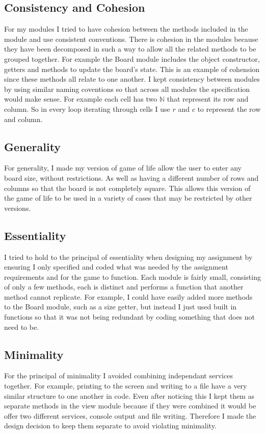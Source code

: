 \documentclass[12pt]{article}
\begin{document}
\subsection{Consistency and Cohesion}
For my modules I tried to have cohesion between the methods included in the module and use consistent conventions. There is cohesion in the modules because they have been decomposed in such a way to allow all the related methods to be grouped together. For example the Board module includes the object constructor, getters and methods to update the board's state. This is an example of cohension since these methods all relate to one another. I kept consistency between modules by using similar naming coventions so that across all modules the specification would make sense. For example each cell has two $\mathbb{N}$ that represent its row and column. So in every loop iterating through cells I use $r$ and $c$ to represent the row and column.

\subsection{Generality}
For generality, I made my version of game of life allow the user to enter any board size, without restrictions. As well as having a different number of rows and columns so that the board is not completely square. This allows this version of the game of life to be used in a variety of cases that may be restricted by other versions.

\subsection{Essentiality}
I tried to hold to the principal of essentiality when designing my assignment by ensuring I only specified and coded what was needed by the assignment requirements and for the game to function. Each module is fairly small, consisting of only a few methods, each is distinct and performs a function that another method cannot replicate. For example, I could have easily added more methods to the Board module, such as a size getter, but instead I just used built in functions so that it was not being redundant by coding something that does not need to be.

\subsection{Minimality}
For the principal of minimality I avoided combining independant services together. For example, printing to the screen and writing to a file have a very similar structure to one another in code. Even after noticing this I kept them as separate methods in the view module because if they were combined it would be offer two different services, console output and file writing. Therefore I made the design decision to keep them separate to avoid violating minimality.
\end{document}

